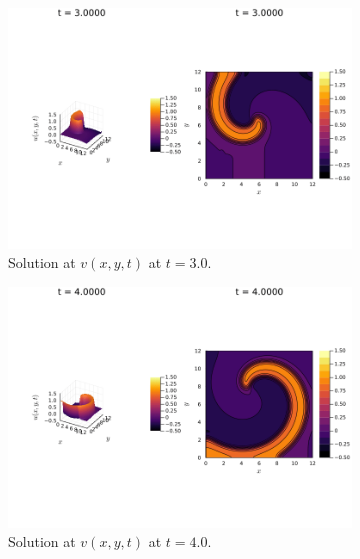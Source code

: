 \documentclass[12pt]{report}
\begin{document}
\begin{solution}
\begin{figure}[H]
\begin{subfigure}[b]{0.45\linewidth}
        \centering
        \includegraphics[width=\linewidth]{images/6-2-300.png}
        \caption{Solution at $v(x,y,t)$ at $t=3.0$.}
        \label{6-2:c}
        \vspace{4ex}
    \end{subfigure}%
    \begin{subfigure}[b]{0.45\linewidth}
        \centering
        \includegraphics[width=\linewidth]{images/6-2-400.png}
        \caption{Solution at $v(x,y,t)$ at $t=4.0$.}
        \label{6-2:d}
        \vspace{4ex}
    \end{subfigure}
    \begin{subfigure}[b]{0.45\linewidth}
        \centering

\end{subfigure}
\end{figure}
\end{solution}
\end{document}
